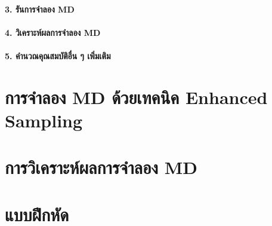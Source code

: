 \paragraph{3. รันการจำลอง MD}

\paragraph{4. วิเคราะห์ผลการจำลอง MD}

\paragraph{5. คำนวณคุณสมบัติอื่น ๆ เพิ่มเติม}

\section{การจำลอง MD ด้วยเทคนิค Enhanced Sampling}

\section{การวิเคราะห์ผลการจำลอง MD}

\section{แบบฝึกหัด}
